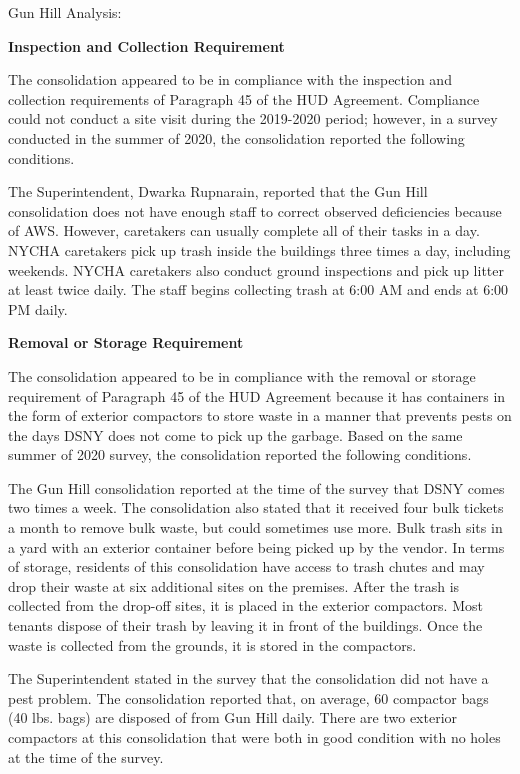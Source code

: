 Gun Hill Analysis: 

\textbf{Inspection and Collection Requirement} 

 

The consolidation appeared to be in compliance with the inspection and collection requirements of Paragraph 45 of the HUD Agreement. Compliance could not conduct a site visit during the 2019-2020 period; however, in a survey conducted in the summer of 2020, the consolidation reported the following conditions.

The Superintendent, Dwarka Rupnarain, reported that the Gun Hill consolidation does not have enough staff to correct observed deficiencies because of AWS. However, caretakers can usually complete all of their tasks in a day. NYCHA caretakers pick up trash inside the buildings three times a day, including weekends. NYCHA caretakers also conduct ground inspections and pick up litter at least twice daily. The staff begins collecting trash at 6:00 AM and ends at 6:00 PM daily. 

\textbf{Removal or Storage Requirement}

The consolidation appeared to be in compliance with the removal or storage requirement of Paragraph  45 of the HUD Agreement because it has containers in the form of exterior compactors to store waste in a manner that prevents pests on the days DSNY does not come to pick up the garbage. Based on the same summer of  2020 survey, the consolidation reported the following conditions. 

 

The Gun Hill consolidation reported at the time of the survey that DSNY comes two times a week. The consolidation also stated that it received four bulk tickets a month to remove bulk waste, but could sometimes use more. Bulk trash sits in a yard with an exterior container before being picked up by the vendor. In terms of storage, residents of this consolidation have access to trash chutes and may drop their waste at six additional sites on the premises. After the trash is collected from the drop-off sites, it is placed in the exterior compactors. Most tenants dispose of their trash by leaving it in front of the buildings. Once the waste is collected from the grounds, it is stored in the compactors.  

 

The Superintendent stated in the survey that the consolidation did not have a pest problem. The consolidation reported that, on average, 60 compactor bags (40 lbs. bags) are disposed of from Gun Hill daily. There are two exterior compactors at this consolidation that were both in good condition with no holes at the time of the survey. 

